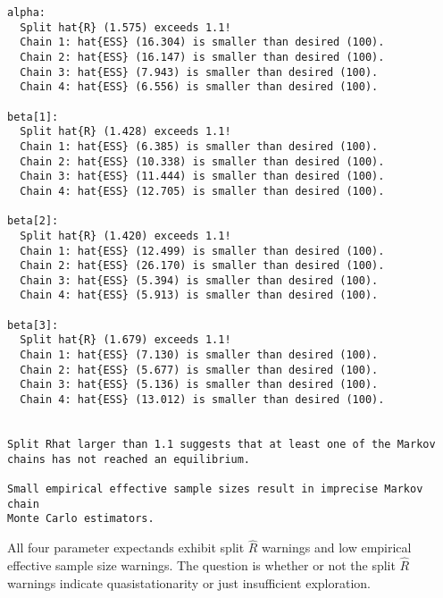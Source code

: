 \documentclass[
  letterpaper,
  DIV=11,
  numbers=noendperiod]{scrartcl}
\newenvironment{Shaded}{\begin{snugshade}}{\end{snugshade}}
\newcommand{\ConstantTok}[1]{\textcolor[rgb]{0.56,0.35,0.01}{#1}}
\newcommand{\FunctionTok}[1]{\textcolor[rgb]{0.28,0.35,0.67}{#1}}
\newcommand{\NormalTok}[1]{\textcolor[rgb]{0.00,0.23,0.31}{#1}}
\newcommand{\OtherTok}[1]{\textcolor[rgb]{0.00,0.23,0.31}{#1}}
\newcommand{\SpecialCharTok}[1]{\textcolor[rgb]{0.37,0.37,0.37}{#1}}
\newcommand{\StringTok}[1]{\textcolor[rgb]{0.13,0.47,0.30}{#1}}
\begin{document}
\begin{Shaded}
\end{Shaded}

\begin{verbatim}
alpha:
  Split hat{R} (1.575) exceeds 1.1!
  Chain 1: hat{ESS} (16.304) is smaller than desired (100).
  Chain 2: hat{ESS} (16.147) is smaller than desired (100).
  Chain 3: hat{ESS} (7.943) is smaller than desired (100).
  Chain 4: hat{ESS} (6.556) is smaller than desired (100).

beta[1]:
  Split hat{R} (1.428) exceeds 1.1!
  Chain 1: hat{ESS} (6.385) is smaller than desired (100).
  Chain 2: hat{ESS} (10.338) is smaller than desired (100).
  Chain 3: hat{ESS} (11.444) is smaller than desired (100).
  Chain 4: hat{ESS} (12.705) is smaller than desired (100).

beta[2]:
  Split hat{R} (1.420) exceeds 1.1!
  Chain 1: hat{ESS} (12.499) is smaller than desired (100).
  Chain 2: hat{ESS} (26.170) is smaller than desired (100).
  Chain 3: hat{ESS} (5.394) is smaller than desired (100).
  Chain 4: hat{ESS} (5.913) is smaller than desired (100).

beta[3]:
  Split hat{R} (1.679) exceeds 1.1!
  Chain 1: hat{ESS} (7.130) is smaller than desired (100).
  Chain 2: hat{ESS} (5.677) is smaller than desired (100).
  Chain 3: hat{ESS} (5.136) is smaller than desired (100).
  Chain 4: hat{ESS} (13.012) is smaller than desired (100).


Split Rhat larger than 1.1 suggests that at least one of the Markov
chains has not reached an equilibrium.

Small empirical effective sample sizes result in imprecise Markov chain
Monte Carlo estimators.
\end{verbatim}

All four parameter expectands exhibit split \(\hat{R}\) warnings and low
empirical effective sample size warnings. The question is whether or not
the split \(\hat{R}\) warnings indicate quasistationarity or just
insufficient exploration.
\end{document}
